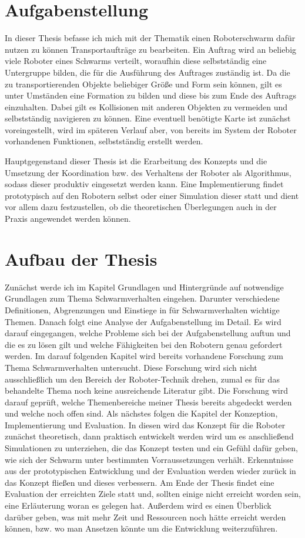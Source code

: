 \section{Aufgabenstellung}\label{sec:Aufgabenstellung}
In dieser Thesis befasse ich mich mit der Thematik einen Roboterschwarm dafür nutzen zu können Transportaufträge zu bearbeiten. Ein Auftrag wird an beliebig viele Roboter eines Schwarms verteilt, woraufhin diese selbstständig eine Untergruppe bilden, die für die Ausführung des Auftrages zuständig ist. Da die zu transportierenden Objekte beliebiger Größe und Form sein können, gilt es unter Umständen eine Formation zu bilden und diese bis zum Ende des Auftrags einzuhalten. Dabei gilt es Kollisionen mit anderen Objekten zu vermeiden und selbstständig navigieren zu können. Eine eventuell benötigte Karte ist zunächst voreingestellt, wird im späteren Verlauf aber, von bereits im System der Roboter vorhandenen Funktionen, selbstständig erstellt werden.

Hauptgegenstand dieser Thesis ist die Erarbeitung des Konzepts und die Umsetzung der Koordination bzw. des Verhaltens der Roboter als Algorithmus, sodass dieser produktiv eingesetzt werden kann. Eine Implementierung findet prototypisch auf den Robotern selbst oder einer Simulation dieser statt und dient vor allem dazu festzustellen, ob die theoretischen Überlegungen auch in der Praxis angewendet werden können.

\section{Aufbau der Thesis}\label{sec:AufbauDerThesis}
Zunächst werde ich im Kapitel Grundlagen und Hintergründe auf notwendige Grundlagen zum Thema Schwarmverhalten eingehen. Darunter verschiedene Definitionen, Abgrenzungen und Einstiege in für Schwarmverhalten wichtige Themen.
Danach folgt eine Analyse der Aufgabenstellung im Detail. Es wird darauf eingegangen, welche Probleme sich bei der Aufgabenstellung auftun und die es zu lösen gilt und welche Fähigkeiten bei den Robotern genau gefordert werden.
Im darauf folgenden Kapitel wird bereits vorhandene Forschung zum Thema Schwarmverhalten untersucht. Diese Forschung wird sich nicht ausschließlich um den Bereich der Roboter-Technik drehen, zumal es für das behandelte Thema noch keine ausreichende Literatur gibt. Die Forschung wird darauf geprüft, welche Themenbereiche meiner Thesis bereits abgedeckt werden und welche noch offen sind.
Als nächstes folgen die Kapitel der Konzeption, Implementierung und Evaluation. In diesen wird das Konzept für die Roboter zunächst theoretisch, dann praktisch entwickelt werden wird um es anschließend Simulationen zu unterziehen, die das Konzept testen und ein Gefühl dafür geben, wie sich der Schwarm unter bestimmten Vorraussetzungen verhält. Erkenntnisse aus der prototypischen Entwicklung und der Evaluation werden wieder zurück in das Konzept fließen und dieses verbessern.
Am Ende der Thesis findet eine Evaluation der erreichten Ziele statt und, sollten einige nicht erreicht worden sein, eine Erläuterung woran es gelegen hat. Außerdem wird es einen Überblick darüber geben, was mit mehr Zeit und Ressourcen noch hätte erreicht werden können, bzw. wo man Ansetzen könnte um die Entwicklung weiterzuführen.